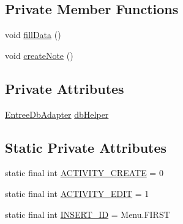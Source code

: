 \subsection*{\-Private \-Member \-Functions}
\begin{DoxyCompactItemize}
\item 
void \hyperlink{classsrdes_1_1menupp_1_1_view_review_a8808d035d7946cd5df0fdf1b9af8e74f}{fill\-Data} ()
\item 
void \hyperlink{classsrdes_1_1menupp_1_1_view_review_a537b46cf887dc482e872989d62bb1c40}{create\-Note} ()
\end{DoxyCompactItemize}
\subsection*{\-Private \-Attributes}
\begin{DoxyCompactItemize}
\item 
\hyperlink{classsrdes_1_1menupp_1_1_entree_db_adapter}{\-Entree\-Db\-Adapter} \hyperlink{classsrdes_1_1menupp_1_1_view_review_aec8675e064e96d2cbaa0baaf96dfa291}{db\-Helper}
\end{DoxyCompactItemize}
\subsection*{\-Static \-Private \-Attributes}
\begin{DoxyCompactItemize}
\item 
static final int \hyperlink{classsrdes_1_1menupp_1_1_view_review_a746a5ff6602981707a4b20cae97e6910}{\-A\-C\-T\-I\-V\-I\-T\-Y\-\_\-\-C\-R\-E\-A\-T\-E} = 0
\item 
static final int \hyperlink{classsrdes_1_1menupp_1_1_view_review_a65283f0ea5aaeaa85347218e8a6f4bcb}{\-A\-C\-T\-I\-V\-I\-T\-Y\-\_\-\-E\-D\-I\-T} = 1
\item 
static final int \hyperlink{classsrdes_1_1menupp_1_1_view_review_a0b19054e74f550bc248b4fd16de8f7b4}{\-I\-N\-S\-E\-R\-T\-\_\-\-I\-D} = \-Menu.\-F\-I\-R\-S\-T
\end{DoxyCompactItemize}


